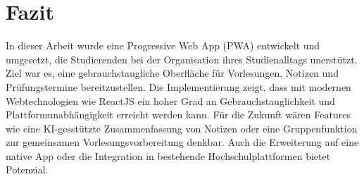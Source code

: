 \chapter{Fazit}

In dieser Arbeit wurde eine Progressive Web App (PWA) entwickelt und umgesetzt, die Studierenden bei der Organisation ihres Studienalltags unerstützt. Ziel war es, eine gebrauchstaugliche Oberfläche für Vorlesungen, Notizen und Prüfungstermine bereitzustellen.\newline 
Die Implementierung zeigt, dass mit modernen Webtechnologien wie ReactJS ein hoher Grad an Gebrauchstauglichkeit und Plattformunabhängigkeit erreicht werden kann. \newline
Für die Zukunft wären Features wie eine KI-gesstützte Zusammenfassung von Notizen oder eine Gruppenfunktion zur gemeinsamen Vorlesungsvorbereitung denkbar. Auch die Erweiterung auf eine native App oder die Integration in bestehende Hochschulplattformen bietet Potenzial.